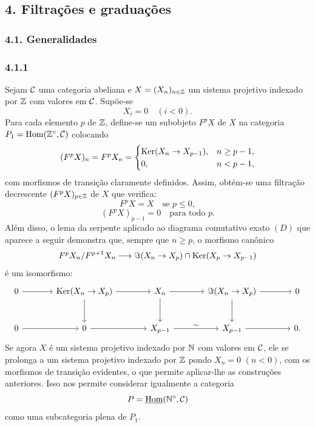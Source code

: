 \subsection*{4. Filtrações e graduações}
\subsubsection*{4.1. Generalidades}
\subsubsection*{4.1.1}
Sejam $\mathcal C$ uma categoria abeliana e $X=(X_n)_{n\in\mathbb Z}$ um sistema projetivo indexado por $\mathbb Z$ com valores em $\mathcal C$. Supõe-se
\[
X_i=0\quad(i<0).
\]
Para cada elemento $p$ de $\mathbb Z$, define-se um subobjeto $F^pX$ de $X$ na categoria $P_1=\operatorname{Hom}(\mathbb Z^\circ,\mathcal C)$ colocando
\[
(F^pX)_n=F^pX_n=
\begin{cases}
\operatorname{Ker}(X_n\to X_{p-1}),& n\ge p-1,\\
0,& n<p-1,
\end{cases}
\]
com morfismos de transição claramente definidos. Assim, obtém-se uma filtração decrescente $(F^pX)_{p\in\mathbb Z}$ de $X$ que verifica:
\begin{equation}\tag{a}
F^pX=X\quad\text{se }p\le0,
\end{equation}
\begin{equation}\tag{b}
(F^pX)_{p-1}=0\quad\text{para todo }p.
\end{equation}
Além disso, o lema da serpente aplicado ao diagrama comutativo exato $(D)$ que aparece a seguir demonstra que, sempre que $n\ge p$, o morfismo canônico
\[
F^pX_n/F^{p+1}X_n\longrightarrow \Im(X_n\to X_p)\cap\operatorname{Ker}(X_p\to X_{p-1})
\]
é um isomorfismo:
\[
\begin{tikzcd}[column sep=large,row sep=large]
0 \arrow[r] & \Ker(X_n\to X_p) \arrow[r] \arrow[d] & X_n \arrow[r] \arrow[d] & \Im(X_n\to X_p) \arrow[r] \arrow[d] & 0\\
0 \arrow[r] & 0 \arrow[r] & X_{p-1} \arrow[r,"\sim"] & X_{p-1} \arrow[r] & 0 .
\end{tikzcd}
\]
Se agora $X$ é um sistema projetivo indexado por $\mathbb N$ com valores em $\mathcal C$, ele se prolonga a um sistema projetivo indexado por $\mathbb Z$ pondo $X_n=0$ $(n<0)$, com os morfismos de transição evidentes, o que permite aplicar-lhe as construções anteriores. Isso nos permite considerar igualmente a categoria
\[
P=\underline{\operatorname{Hom}}(\mathbb N^\circ,\mathcal C)
\]
como uma subcategoria plena de $P_1$.
